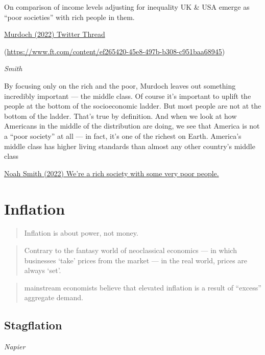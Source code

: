 \documentclass[
]{book}
\begin{document}
On comparison of income levels adjusting for inequality
UK \& USA emerge as ``poor societies'' with rich people in them.

\href{https://twitter.com/jburnmurdoch/status/1570832839318605824}{Murdoch (2022) Twitter Thread}

\citep[ (2022) FT (paywall)]{jburnmurdoch}(\url{https://www.ft.com/content/ef265420-45e8-497b-b308-c951baa68945})

\emph{Smith}

By focusing only on the rich and the poor, Murdoch leaves out something incredibly important --- the middle class. Of course it's important to uplift the people at the bottom of the socioeconomic ladder. But most people are not at the bottom of the ladder. That's true by definition. And when we look at how Americans in the middle of the distribution are doing, we see that America is not a ``poor society'' at all --- in fact, it's one of the richest on Earth.
America's middle class has higher living standards than almost any other country's middle class

\href{https://noahpinion.substack.com/p/no-the-us-is-not-a-poor-society-with}{Noah Smith (2022) We're a rich society with some very poor people.}

\hypertarget{inflation-1}{%
\chapter{Inflation}\label{inflation-1}}

\begin{quote}
Inflation is about power, not money.
\end{quote}

\begin{quote}
Contrary to the fantasy world of neoclassical economics --- in which businesses `take' prices from the market --- in the real world, prices are always `set'.
\end{quote}

\begin{quote}
mainstream economists believe that elevated inflation is a result of ``excess'' aggregate demand.
\end{quote}

\hypertarget{stagflation}{%
\section{Stagflation}\label{stagflation}}

\emph{Napier}
\end{document}
